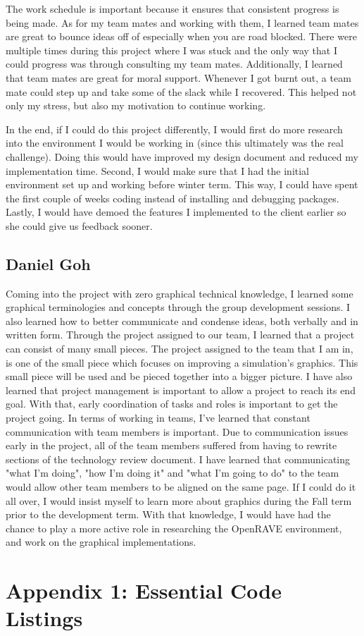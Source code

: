 \documentclass[10pt,journal,compsoc,draftclsnofoot]{IEEEtran}
\begin{document}
\begin{flushleft}
The work schedule is important because it ensures that consistent progress is being made.
As for my team mates and working with them, I learned team mates are great to bounce ideas off of especially when you are road blocked.
There were multiple times during this project where I was stuck and the only way that I could progress was through consulting my team mates.
Additionally, I learned that team mates are great for moral support.
Whenever I got burnt out, a team mate could step up and take some of the slack while I recovered.
This helped not only my stress, but also my motivation to continue working. \par
\vspace{3mm}
In the end, if I could do this project differently, I would first do more research into the environment I would be working in (since this ultimately was the real challenge).
Doing this would have improved my design document and reduced my implementation time.
Second, I would make sure that I had the initial environment set up and working before winter term.
This way, I could have spent the first couple of weeks coding instead of installing and debugging packages.
Lastly, I would have demoed the features I implemented to the client earlier so she could give us feedback sooner.
\subsection{Daniel Goh}
Coming into the project with zero graphical technical knowledge, I learned some graphical terminologies and concepts through the group development sessions.
I also learned how to better communicate and condense ideas, both verbally and in written form. 
Through the project assigned to our team, I learned that a project can consist of many small pieces.
The project assigned to the team that I am in, is one of the small piece which focuses on improving a simulation's graphics.
This small piece will be used and be pieced together into a bigger picture.
I have also learned that project management is important to allow a project to reach its end goal.
With that, early coordination of tasks and roles is important to get the project going.
In terms of working in teams, I've learned that constant communication with team members is important.
Due to communication issues early in the project, all of the team members suffered from having to rewrite sections of the technology review document.
I have learned that communicating "what I'm doing", "how I'm doing it" and "what I'm going to do" to the team would allow other team members to be aligned on the same page.
If I could do it all over, I would insist myself to learn more about graphics during the Fall term prior to the development term.
With that knowledge, I would have had the chance to play a more active role in researching the OpenRAVE environment, and work on the graphical implementations.

\newpage

\section{Appendix 1: Essential Code Listings}



\end{flushleft}
\end{document}
